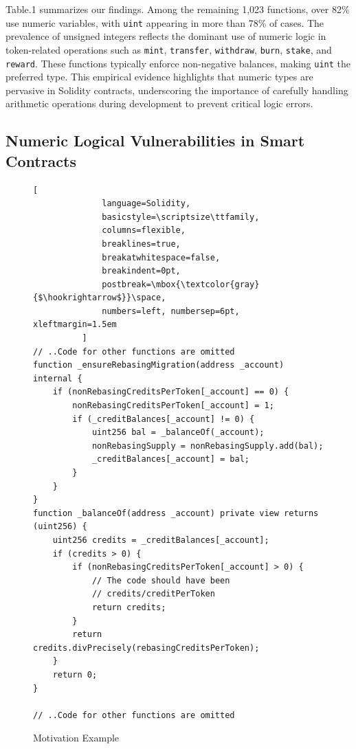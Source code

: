 \documentclass[10pt, conference]{IEEEtran}
\begin{document}
Table.1 summarizes our findings. Among the remaining 1,023 functions, over 82\% use numeric variables, with \texttt{uint} appearing in more than 78\% of cases. The prevalence of unsigned integers reflects the dominant use of numeric logic in token-related operations such as \texttt{mint}, \texttt{transfer}, \texttt{withdraw}, \texttt{burn}, \texttt{stake}, and \texttt{reward}. These functions typically enforce non-negative balances, making \texttt{uint} the preferred type. This empirical evidence highlights that numeric types are pervasive in Solidity contracts, underscoring the importance of carefully handling arithmetic operations during development to prevent critical logic errors.


\subsection{Numeric Logical Vulnerabilities in Smart Contracts}

    \begin{figure}
                \centering
          \begin{lstlisting}[
              language=Solidity,
              basicstyle=\scriptsize\ttfamily,
              columns=flexible,
              breaklines=true,
              breakatwhitespace=false,
              breakindent=0pt,
              postbreak=\mbox{\textcolor{gray}{$\hookrightarrow$}}\space,
              numbers=left, numbersep=6pt, xleftmargin=1.5em
          ]
// ..Code for other functions are omitted
function _ensureRebasingMigration(address _account) internal {
    if (nonRebasingCreditsPerToken[_account] == 0) {
        nonRebasingCreditsPerToken[_account] = 1;
        if (_creditBalances[_account] != 0) {            
            uint256 bal = _balanceOf(_account);
            nonRebasingSupply = nonRebasingSupply.add(bal);
            _creditBalances[_account] = bal;
        }            
    }
}
function _balanceOf(address _account) private view returns (uint256) {
    uint256 credits = _creditBalances[_account];
    if (credits > 0) {
        if (nonRebasingCreditsPerToken[_account] > 0) {
            // The code should have been 
            // credits/creditPerToken
            return credits;
        }
        return credits.divPrecisely(rebasingCreditsPerToken);
    }
    return 0;
}

// ..Code for other functions are omitted
        \end{lstlisting}
        \caption{Motivation Example~\cite{fig1}}
    \end{figure}
    
\end{document}
